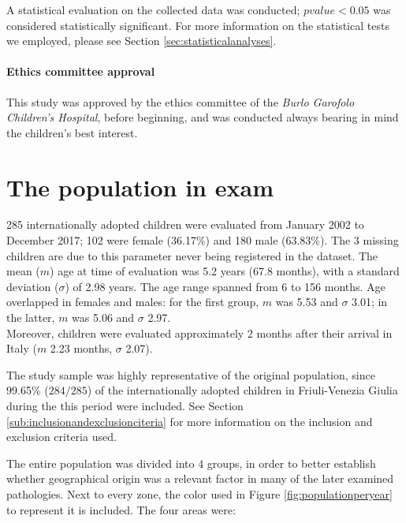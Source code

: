 A statistical evaluation on the collected data was conducted; $p value < 0.05$ was considered statistically significant. For more information on the statistical tests we employed, please see Section \ref{sec:statisticalanalyses}.

\paragraph*{Ethics committee approval} This study was approved by the ethics committee of the \textit{Burlo Garofolo Children's Hospital}, before beginning, and was conducted always bearing in mind the children's best interest. 


\section{The population in exam}\label{sec:thepopulationinexam}
285 internationally adopted children were evaluated from January  2002 to December  2017; 102 were female (36.17\%) and 180 male (63.83\%). The 3 missing children are due to this parameter never being registered in the dataset. The mean ($m$) age at time of evaluation was 5.2 years (67.8 months), with a standard deviation ($\sigma$) of 2.98 years. The age range spanned from 6 to 156 months. Age overlapped in females and males: for the first group, $m$ was 5.53 and $\sigma$ 3.01; in the latter, $m$ was 5.06 and $\sigma$ 2.97.\\
Moreover, children were evaluated approximately 2 months after their arrival in Italy ($m$ 2.23 months, $\sigma$ 2.07).

The study sample was highly representative of the original population, since 99.65\% ($284/285$) of the internationally adopted children in Friuli-Venezia Giulia during the this period were included. See Section \ref{sub:inclusionandexclusionciteria} for more information on the inclusion and exclusion criteria used.

The entire population was divided into 4 groups, in order to better establish whether geographical origin was a relevant factor in many of the later examined pathologies. Next to every zone, the color used in Figure \ref{fig:populationperyear} to represent it is included. The four areas were:

